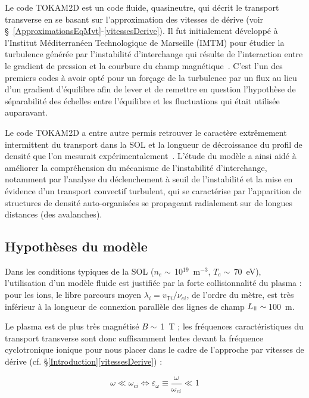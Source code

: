 \begin{refsection}
Le code TOKAM2D est un code fluide, quasineutre, qui décrit le transport
transverse en se basant sur l'approximation des vitesses de dérive (voir
\S~\ref{ApproximationsEqMvt}-\ref{vitessesDerive}). Il fut initialement
développé à l'Institut Méditerranéen Technologique de Marseille (IMTM) pour
étudier la turbulence générée par l'instabilité d'interchange qui résulte de
l'interaction entre le gradient de pression et la courbure du champ
magnétique~\parencite{Garbet}. C'est l'un des premiers codes à avoir opté pour
un forçage de la turbulence par un flux au lieu d'un gradient d'équilibre afin
de lever et de remettre en question l'hypothèse de séparabilité des échelles
entre l'équilibre et les fluctuations qui était utilisée auparavant.

Le code TOKAM2D a entre autre permis retrouver le caractère extrêmement
intermittent du transport dans la SOL et la longueur de décroissance du profil de densité que l'on
mesurait expérimentalement~\cite{SarazinPhD}. L'étude du modèle a ainsi aidé à
améliorer la compréhension du mécanisme de l'instabilité d'interchange,
notamment par l'analyse
du déclenchement à seuil de l'instabilité et la mise en évidence d'un transport
convectif turbulent, qui se caractérise par l'apparition de structures de
densité auto-organisées se propageant radialement sur de longues distances (des avalanches).

\subsection{Hypothèses du modèle}
Dans les conditions typiques de la SOL ($n_e\sim\,$10$^{19}$~m$^{-3}$,
$T_e\sim\,$70~eV), l'utilisation d'un modèle fluide est justifiée par la forte
collisionnalité du plasma : pour les ions, le libre parcours moyen
$\lambda_i=v_{\text{T}{i}}/\nu_{ei}$, de l'ordre du mètre, est très
inférieur à la longueur de connexion parallèle des lignes de champ
$L_\para\sim\,$100~m.

Le plasma est de plus très magnétisé $B\sim\,$1~T ; les fréquences
caractéristiques du transport transverse sont donc suffisamment lentes devant la
fréquence cyclotronique ionique pour nous placer dans le cadre de
l'approche par vitesses de dérive (cf. \S\ref{Introduction}\ref{vitessesDerive})
:

\begin{equation}
\omega\ll\omega_{ci}\Leftrightarrow
\varepsilon_\omega\equiv\frac{\omega}{\omega_{ci}}\ll 1
\end{equation}


\end{refsection}
